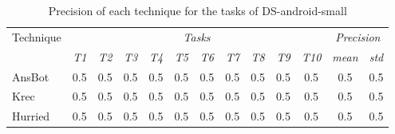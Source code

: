 \begin{table}[H]
\centering    
\begin{scriptsize}
\begin{threeparttable}
\begin{tabular}{lcccccccccccc}

\hline


\multirow{2.5}{*}{Technique}
& \multicolumn{10}{c}{\textit{Tasks}} 
& \multicolumn{2}{c}{\textit{Precision}}
\\  \cmidrule(l){2-11} \cmidrule(l){12-13} 



&
\textit{T1} & \textit{T2} & \textit{T3} & \textit{T4} & \textit{T5}
& \textit{T6} & \textit{T7} & \textit{T8} & \textit{T9} & \textit{T10}
& \textit{mean}
& \textit{std}
\\


\hline
\hline

\acs{AnsBot} 
& 0.5 & 0.5 & 0.5 & 0.5 & 0.5
& 0.5 & 0.5 & 0.5 & 0.5 & 0.5
& 0.5 %
& 0.5 %
\\

\acs{Krec} 
& 0.5 & 0.5 & 0.5 & 0.5 & 0.5
& 0.5 & 0.5 & 0.5 & 0.5 & 0.5
& 0.5 %
& 0.5 %
\\

\acs{Hurried} 
& 0.5 & 0.5 & 0.5 & 0.5 & 0.5
& 0.5 & 0.5 & 0.5 & 0.5 & 0.5
& 0.5 %
& 0.5 %
\\

\hline

\end{tabular}
\end{threeparttable}
\end{scriptsize}
\caption{Precision of each technique for the tasks of \acs{DS-android-small}}
\label{tbl:ds-small-results-precision}
\end{table}

    